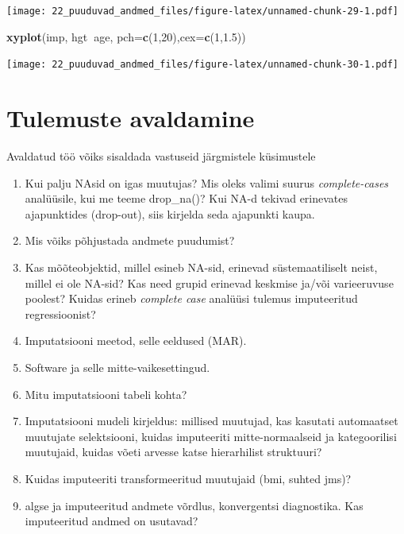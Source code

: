 \documentclass[]{book}
\newenvironment{Shaded}{\begin{snugshade}}{\end{snugshade}}
\newcommand{\KeywordTok}[1]{\textcolor[rgb]{0.13,0.29,0.53}{\textbf{#1}}}
\newcommand{\DataTypeTok}[1]{\textcolor[rgb]{0.13,0.29,0.53}{#1}}
\newcommand{\DecValTok}[1]{\textcolor[rgb]{0.00,0.00,0.81}{#1}}
\newcommand{\FloatTok}[1]{\textcolor[rgb]{0.00,0.00,0.81}{#1}}
\newcommand{\OperatorTok}[1]{\textcolor[rgb]{0.81,0.36,0.00}{\textbf{#1}}}
\newcommand{\NormalTok}[1]{#1}
\begin{document}
\texttt{[image: 22\_puuduvad\_andmed\_files/figure-latex/unnamed-chunk-29-1.pdf]}

\begin{Shaded}
\begin{Highlighting}[]
\KeywordTok{xyplot}\NormalTok{(imp, hgt}\OperatorTok{~}\NormalTok{age, }\DataTypeTok{pch=}\KeywordTok{c}\NormalTok{(}\DecValTok{1}\NormalTok{,}\DecValTok{20}\NormalTok{),}\DataTypeTok{cex=}\KeywordTok{c}\NormalTok{(}\DecValTok{1}\NormalTok{,}\FloatTok{1.5}\NormalTok{))}
\end{Highlighting}
\end{Shaded}

\texttt{[image: 22\_puuduvad\_andmed\_files/figure-latex/unnamed-chunk-30-1.pdf]}

\section{Tulemuste avaldamine}\label{tulemuste-avaldamine}

Avaldatud töö võiks sisaldada vastuseid järgmistele küsimustele

\begin{enumerate}
\def\labelenumi{\arabic{enumi}.}
\item
  Kui palju NAsid on igas muutujas? Mis oleks valimi suurus
  \emph{complete-cases} analüüsile, kui me teeme drop\_na()? Kui NA-d
  tekivad erinevates ajapunktides (drop-out), siis kirjelda seda
  ajapunkti kaupa.
\item
  Mis võiks põhjustada andmete puudumist?
\item
  Kas mõõteobjektid, millel esineb NA-sid, erinevad süstemaatiliselt
  neist, millel ei ole NA-sid? Kas need grupid erinevad keskmise ja/või
  varieeruvuse poolest? Kuidas erineb \emph{complete case} analüüsi
  tulemus imputeeritud regressioonist?
\item
  Imputatsiooni meetod, selle eeldused (MAR).
\item
  Software ja selle mitte-vaikesettingud.
\item
  Mitu imputatsiooni tabeli kohta?
\item
  Imputatsiooni mudeli kirjeldus: millised muutujad, kas kasutati
  automaatset muutujate selektsiooni, kuidas imputeeriti
  mitte-normaalseid ja kategoorilisi muutujaid, kuidas võeti arvesse
  katse hierarhilist struktuuri?
\item
  Kuidas imputeeriti transformeeritud muutujaid (bmi, suhted jms)?
\item
  algse ja imputeeritud andmete võrdlus, konvergentsi diagnostika. Kas
  imputeeritud andmed on usutavad?
\end{enumerate}
\end{document}

